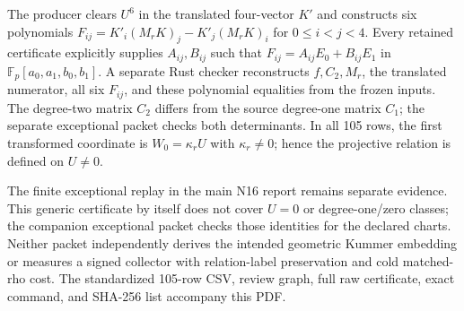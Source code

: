 \documentclass[10pt]{article}
\begin{document}
\noindent The producer clears $U^6$ in the translated four-vector $K'$ and constructs six polynomials $F_{ij}=K'_i(M_rK)_j-K'_j(M_rK)_i$ for $0\le i<j<4$. Every retained certificate explicitly supplies $A_{ij},B_{ij}$ such that $F_{ij}=A_{ij}E_0+B_{ij}E_1$ in $\mathbb F_p[a_0,a_1,b_0,b_1]$. A separate Rust checker reconstructs $f,C_2,M_r$, the translated numerator, all six $F_{ij}$, and these polynomial equalities from the frozen inputs. The degree-two matrix $C_2$ differs from the source degree-one matrix $C_1$; the separate exceptional packet checks both determinants. In all 105 rows, the first transformed coordinate is $W_0=\kappa_r U$ with $\kappa_r\ne0$; hence the projective relation is defined on $U\ne0$.

\noindent The finite exceptional replay in the main N16 report remains separate evidence. This generic certificate by itself does not cover $U=0$ or degree-one/zero classes; the companion exceptional packet checks those identities for the declared charts. Neither packet independently derives the intended geometric Kummer embedding or measures a signed collector with relation-label preservation and cold matched-rho cost. The standardized 105-row CSV, review graph, full raw certificate, exact command, and SHA-256 list accompany this PDF.
\end{document}
